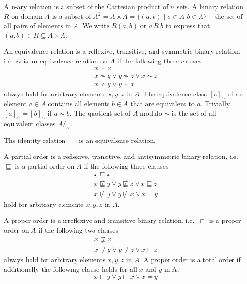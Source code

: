 \begin{definition}
	A n-ary relation is a subset of the Cartesian product of $n$ sets.
	A {\myem binary relation} $R$ on domain $A$ 
	is a subset of $A^2 = A \times A = \{ (a,b) \mid a\in A, b\in A \}$ -- 
	the set of all pairs of elements in $A$.
	We write $R(a,b)$ or $a\ R\ b$ to express that $(a,b)\in R \subseteq A\times A$.
\end{definition}
\begin{definition}
	An {\myem equivalence relation} 
	is a reflexive, transitive, and symmetric binary relation, 
	i.e.~$\sim$ is an equivalence relation on $A$ if the following three clauses
	\begin{align*}
	x\sim x
	\tag*{reflexivivity}
	\\
	x\not\sim y \lor  y \not\sim z \lor x\sim z
	\tag*{transitivity}
	\\
	x\not\sim y \lor y\sim x
	\tag*{symmetry}
	\end{align*}
	always hold for arbitrary elements $x,y,z$ in $A$.
	The {\myem equivalence class} $[a]_\sim$ of an element $a\in A$ contains all elements $b\in A$ that are equivalent to $a$.
	Trivially $[a]_\sim = [b]_\sim$ if $a\sim b$.
	The quotient set of $A$ modulo $\sim$ is the set of all equivalent classes $A/_\sim$. 
\end{definition}

\begin{lemma}
	The identity relation $=$ is an equivalence relation.
\end{lemma}

\begin{definition}
	A {\myem partial order} is a reflexive, transitive, and antisymmetric binary relation, 
	i.e.~$\sqsubseteq$ is a partial order on $A$ if
	the following three clauses
	\begin{align*}
	x\sqsubseteq x
	\tag*{reflexivivity}
	\\
	x\not\sqsubseteq y \lor  y \not\sqsubseteq z \lor x\sqsubseteq z
	\tag*{transitivity}
	\\
	x\not\sqsubseteq y \lor y\not\sqsubseteq x \lor x = y
	\tag*{antisymmetry}
	\end{align*}
	hold for arbitrary elements $x,y,z$ in $A$.
\end{definition}

\begin{definition}
	A {\myem proper order} is a irreflexive and transitive binary relation, 
	i.e.~$\sqsubset$ is a proper order on $A$ if the following two clauses
	\begin{align*}
	x\not\sqsubset x
	\tag*{irreflexivivity}
	\\
	x\not\sqsubset y \lor  y \not\sqsubset z \lor x\sqsubset z
	\tag*{transitivity}
	\end{align*}
	always hold for arbitrary elements $x,y,z$ in $A$.
	A proper order is a {\myem total order} if additionally the following clause holds
	for all $x$ and $y$ in A.
	\[
		x \sqsubset y \lor y \sqsubset x  \lor x=y \tag*{totality}
	\]
\end{definition}

